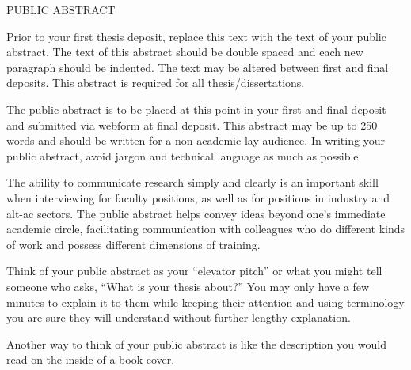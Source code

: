 \begin{doublespace}
\begin{tightcenter}
PUBLIC ABSTRACT
\mylinespacing
\end{tightcenter}

Prior to your first thesis deposit, replace this text with the text of your public abstract. The text of this abstract should be double spaced and each new paragraph should be indented. The text may be altered between first and final deposits. This abstract is required for all thesis/dissertations. 

The public abstract is to be placed at this point in your first and final deposit and submitted via webform at final deposit. This abstract may be up to 250 words and should be written for a non-academic lay audience. In writing your public abstract, avoid jargon and technical language as much as possible. 

The ability to communicate research simply and clearly is an important skill when interviewing for faculty positions, as well as for positions in industry and alt-ac sectors. The public abstract helps convey ideas beyond one’s immediate academic circle, facilitating communication with colleagues who do different kinds of work and possess different dimensions of training.

Think of your public abstract as your “elevator pitch” or what you might tell someone who asks, “What is your thesis about?” You may only have a few minutes to explain it to them while keeping their attention and using terminology you are sure they will understand without further lengthy explanation.

Another way to think of your public abstract is like the description you would read on the inside of a book cover.

\end{doublespace}

